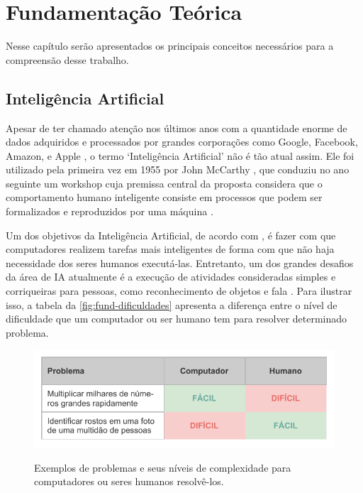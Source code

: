 \chapter{Fundamentação Teórica} \label{cap:fund}

Nesse capítulo serão apresentados os principais conceitos necessários para a compreensão desse trabalho.
\section{Inteligência Artificial} \label{cap:fund-ia}

Apesar de ter chamado atenção nos últimos anos com a quantidade enorme de dados adquiridos e processados por grandes corporações como Google, Facebook, Amazon, e Apple \cite{ref:Lawless-Mittu-Sofge}, o termo `Inteligência Artificial' não é tão atual assim. Ele foi utilizado pela primeira vez em 1955 por John McCarthy \cite{ref:Cohen}, que conduziu no ano seguinte um workshop cuja premissa central da proposta considera que o comportamento humano inteligente consiste em processos que podem ser formalizados e reproduzidos por uma máquina \cite{ref:Harvard-AI}. %

Um dos objetivos da Inteligência Artificial, de acordo com , é fazer com que computadores realizem tarefas mais inteligentes de forma com que não haja necessidade dos seres humanos executá-las. Entretanto, um dos grandes desafios da área de IA atualmente é a execução de atividades consideradas simples e corriqueiras para pessoas, como reconhecimento de objetos e fala \cite{ref:Goodfellow-Bengio-Courville}. Para ilustrar isso, a tabela da \autoref{fig:fund-dificuldades} apresenta a diferença entre o nível de dificuldade que um computador ou ser humano tem para resolver determinado problema.

\begin{figure}[h!] %
  \centering
  \caption{Exemplos de problemas e seus níveis de complexidade para computadores ou seres humanos resolvê-los.}
  \includegraphics[scale=1.1]{img/img-fundamentacao-dificuldades.pdf}
  \label{fig:fund-dificuldades}
\end{figure}

